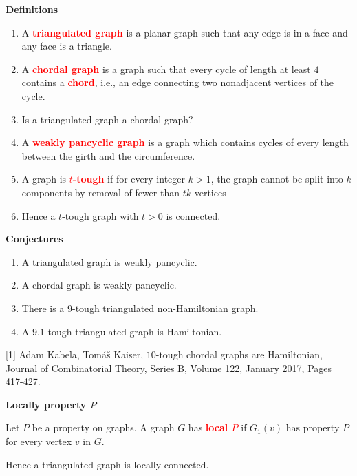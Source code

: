 \documentclass{beamer}
\title[]{}
\author[]{ }
\date[]{}
\theoremstyle{plain}
\theoremstyle{definition}
\begin{document}
\begin{frame}{\bf Definitions}


\begin{enumerate}
\item A \textcolor{red}{\bf triangulated graph} is a planar graph such that any edge is in a face and any face is a triangle. 
\item A \textcolor{red}{\bf chordal graph} is a graph such that every cycle of length at least $4$ contains a \textcolor{red}{\bf chord}, i.e., an edge connecting two nonadjacent vertices of the cycle. 
\item Is a triangulated graph a chordal graph? 
\item A \textcolor{red}{\bf weakly  pancyclic graph} is a graph which contains cycles of every length between the girth and the circumference. 
\item A graph is \textcolor{red}{\bf $t$-tough}  if for every integer $k>1$, the graph cannot be split into $k$ components by removal of fewer than $tk$ vertices 
\item Hence a $t$-tough graph with $t>0$ is connected.  
\end{enumerate}

\end{frame}









\begin{frame}{\bf Conjectures}

\begin{enumerate}
\item A triangulated graph is weakly  pancyclic.
\item A chordal graph is weakly  pancyclic.
\item There is a  $9$-tough triangulated non-Hamiltonian graph. 
\item A $9.1$-tough triangulated graph is Hamiltonian. 
\end{enumerate}
\bigskip 



[1] Adam Kabela, Tom\'{a}\v{s} Kaiser, $10$-tough chordal graphs are Hamiltonian, Journal of Combinatorial Theory, Series B, Volume 122, January 2017, Pages 417-427.
\end{frame}


\begin{frame}{\bf Locally property $P$} 

Let $P$ be a property on graphs. 
A graph $G$ has \textcolor{red}{\bf local $P$} if $G_1(v)$ has property $P$ for every vertex $v$ in $G$. 
\bigskip 


Hence a triangulated graph is locally connected.
\end{frame}
\end{document}
